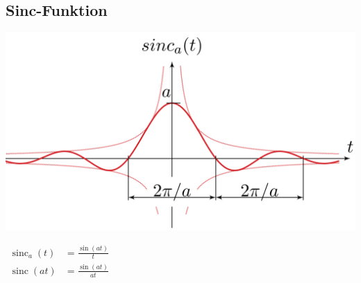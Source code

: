 		\subsection{Sinc-Funktion}
		\begin{minipage}{0.2\textwidth}
			\includegraphics[width=\textwidth]{./bilder/funktionen/sincF.png}
		\end{minipage}
		\qquad
		\begin{minipage}{0.45\textwidth}
			\begin{math}
				\begin{aligned}
					\operatorname{sinc}_{a}(t) &= \frac{\sin (a t)}{t} \\
					\operatorname{sinc}(a t) &= \frac{\sin (a t)}{a t}
				\end{aligned}
			\end{math}
		\end{minipage}
		\qquad
		\begin{minipage}{0.25\textwidth}						
		\end{minipage}\\
	
	
	